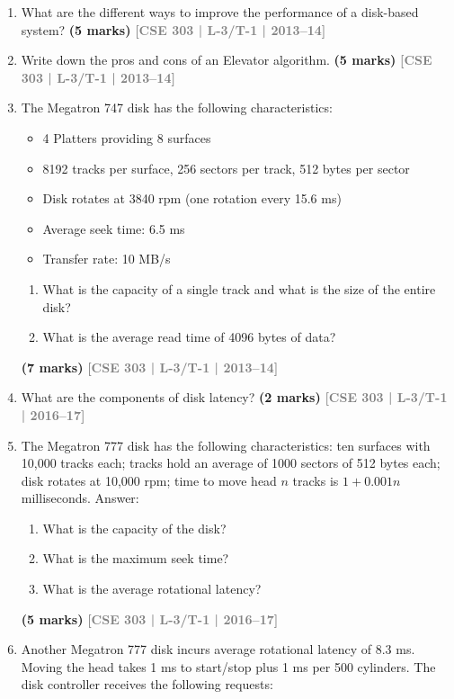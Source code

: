 \documentclass[12pt,a3paper]{article}
\newcommand{\yr}[1]{\hfill\textcolor{gray}{\small\textbf{[#1]}}}
\newcommand{\mk}[1]{\textcolor{orange!70!black}{\small\textbf{(#1 marks)}}}
\begin{document}
\begin{enumerate}
\item What are the different ways to improve the performance of a disk-based system?
\mk{5} \yr{CSE 303 | L-3/T-1 | 2013--14}

\item Write down the pros and cons of an Elevator algorithm.
\mk{5} \yr{CSE 303 | L-3/T-1 | 2013--14}

\item The Megatron 747 disk has the following characteristics:
\begin{itemize}[leftmargin=1.5em,itemsep=1pt]
  \item 4 Platters providing 8 surfaces
  \item 8192 tracks per surface, 256 sectors per track, 512 bytes per sector
  \item Disk rotates at 3840 rpm (one rotation every 15.6 ms)
  \item Average seek time: 6.5 ms
  \item Transfer rate: 10 MB/s
\end{itemize}
\begin{enumerate}
  \item What is the capacity of a single track and what is the size of the entire disk?
  \item What is the average read time of 4096 bytes of data?
\end{enumerate}
  \mk{7} \yr{CSE 303 | L-3/T-1 | 2013--14}

\item What are the components of disk latency?
\mk{2} \yr{CSE 303 | L-3/T-1 | 2016--17}

\item The Megatron 777 disk has the following characteristics: ten surfaces with 10,000 tracks each; tracks hold an average of 1000 sectors of 512 bytes each; disk rotates at 10,000 rpm; time to move head $n$ tracks is $1 + 0.001n$ milliseconds. Answer:
\begin{enumerate}
  \item What is the capacity of the disk?
  \item What is the maximum seek time?
  \item What is the average rotational latency?
\end{enumerate}
\mk{5} \yr{CSE 303 | L-3/T-1 | 2016--17}

\item Another Megatron 777 disk incurs average rotational latency of 8.3 ms. Moving the head takes 1 ms to start/stop plus 1 ms per 500 cylinders. The disk controller receives the following requests:


\end{enumerate}
\end{document}
